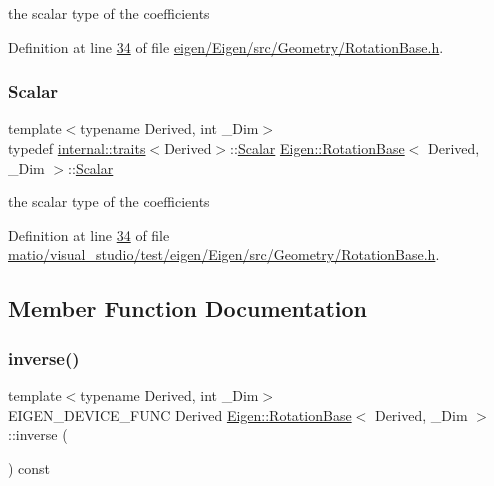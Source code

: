 the scalar type of the coefficients 

Definition at line \hyperlink{eigen_2_eigen_2src_2_geometry_2_rotation_base_8h_source_l00034}{34} of file \hyperlink{eigen_2_eigen_2src_2_geometry_2_rotation_base_8h_source}{eigen/\+Eigen/src/\+Geometry/\+Rotation\+Base.\+h}.

\mbox{\label{class_eigen_1_1_rotation_base_af9b43eac462d7aa70b018efd49c13ef4}} 
\subsubsection{\texorpdfstring{Scalar}{Scalar}\hspace{0.1cm}{\footnotesize\ttfamily [2/2]}}
{\footnotesize\ttfamily template$<$typename Derived, int \+\_\+\+Dim$>$ \\
typedef \hyperlink{struct_eigen_1_1internal_1_1traits}{internal\+::traits}$<$Derived$>$\+::\hyperlink{class_eigen_1_1_rotation_base_af9b43eac462d7aa70b018efd49c13ef4}{Scalar} \hyperlink{class_eigen_1_1_rotation_base}{Eigen\+::\+Rotation\+Base}$<$ Derived, \+\_\+\+Dim $>$\+::\hyperlink{class_eigen_1_1_rotation_base_af9b43eac462d7aa70b018efd49c13ef4}{Scalar}}

the scalar type of the coefficients 

Definition at line \hyperlink{matio_2visual__studio_2test_2eigen_2_eigen_2src_2_geometry_2_rotation_base_8h_source_l00034}{34} of file \hyperlink{matio_2visual__studio_2test_2eigen_2_eigen_2src_2_geometry_2_rotation_base_8h_source}{matio/visual\+\_\+studio/test/eigen/\+Eigen/src/\+Geometry/\+Rotation\+Base.\+h}.



\subsection{Member Function Documentation}
\mbox{\label{class_eigen_1_1_rotation_base_a2835ea92940986b4220cf47538a6bc41}} 
\subsubsection{\texorpdfstring{inverse()}{inverse()}\hspace{0.1cm}{\footnotesize\ttfamily [1/2]}}
{\footnotesize\ttfamily template$<$typename Derived, int \+\_\+\+Dim$>$ \\
E\+I\+G\+E\+N\+\_\+\+D\+E\+V\+I\+C\+E\+\_\+\+F\+U\+NC Derived \hyperlink{class_eigen_1_1_rotation_base}{Eigen\+::\+Rotation\+Base}$<$ Derived, \+\_\+\+Dim $>$\+::inverse (\begin{DoxyParamCaption}{ }\end{DoxyParamCaption}) const\hspace{0.3cm}{\ttfamily [inline]}}

